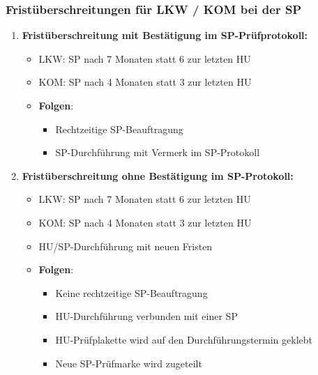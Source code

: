 \documentclass{vorlage-design-main}
\begin{document}
\subsubsection{Fristüberschreitungen für LKW / KOM bei der
SP}\label{fristueberschreitungen-fuer-lkw-kom-bei-der-sp}

\begin{enumerate}
\def\labelenumi{\arabic{enumi}.}

\item
  \textbf{Fristüberschreitung mit Bestätigung im SP-Prüfprotokoll:}

  \begin{itemize}
  
  \item
    LKW: SP nach 7 Monaten statt 6 zur letzten HU
  \item
    KOM: SP nach 4 Monaten statt 3 zur letzten HU
  \item
    \textbf{Folgen}:

    \begin{itemize}
    
    \item
      Rechtzeitige SP-Beauftragung
    \item
      SP-Durchführung mit Vermerk im SP-Protokoll
    \end{itemize}
  \end{itemize}
\item
  \textbf{Fristüberschreitung ohne Bestätigung im SP-Protokoll:}

  \begin{itemize}
  
  \item
    LKW: SP nach 7 Monaten statt 6 zur letzten HU
  \item
    KOM: SP nach 4 Monaten statt 3 zur letzten HU
  \item
    HU/SP-Durchführung mit neuen Fristen
  \item
    \textbf{Folgen}:

    \begin{itemize}
    
    \item
      Keine rechtzeitige SP-Beauftragung
    \item
      HU-Durchführung verbunden mit einer SP
    \item
      HU-Prüfplakette wird auf den Durchführungstermin geklebt
    \item
      Neue SP-Prüfmarke wird zugeteilt
    \end{itemize}
  \end{itemize}
\end{enumerate}
\end{document}
